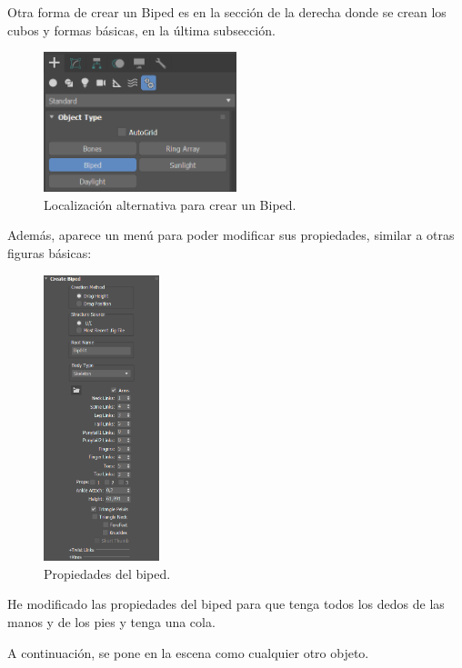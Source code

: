 \documentclass[]{article}
\begin{document}
Otra forma de crear un Biped es en la sección de la derecha donde se crean los cubos y formas básicas, en la última subsección.

\begin{figure}[H]
   \centering
   \includegraphics[width=0.5\textwidth]{imagenes/bipedNew.png}
   \caption{Localización alternativa para crear un Biped.}
\end{figure}

Además, aparece un menú para poder modificar sus propiedades, similar a otras figuras básicas:

\begin{figure}[H]
   \centering
   \includegraphics[width=0.3\textwidth]{imagenes/prop.png}
   \caption{Propiedades del biped.}
\end{figure}

He modificado las propiedades del biped para que tenga todos los dedos de las manos y de los pies y tenga una cola.

\bigskip
\newpage

A continuación, se pone en la escena como cualquier otro objeto.
\end{document}
